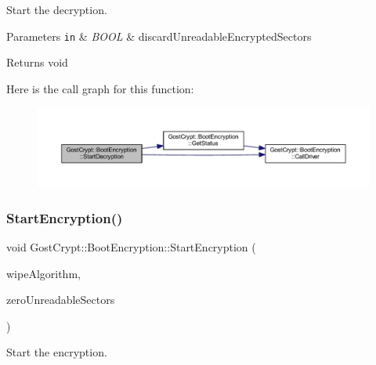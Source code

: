 Start the decryption. 


\begin{DoxyParams}[1]{Parameters}
\mbox{\tt in}  & {\em B\+O\+OL} & discard\+Unreadable\+Encrypted\+Sectors \\
\hline
\end{DoxyParams}
\begin{DoxyReturn}{Returns}
void 
\end{DoxyReturn}
Here is the call graph for this function\+:
\nopagebreak
\begin{figure}[H]
\begin{center}
\leavevmode
\includegraphics[width=350pt]{class_gost_crypt_1_1_boot_encryption_a1397fa6ebb63da2ca0a636cfa8262858_cgraph}
\end{center}
\end{figure}
\mbox{\label{class_gost_crypt_1_1_boot_encryption_a4dd591bdb27968b702694bcd7664e010}} 
\subsubsection{\texorpdfstring{Start\+Encryption()}{StartEncryption()}}
{\footnotesize\ttfamily void Gost\+Crypt\+::\+Boot\+Encryption\+::\+Start\+Encryption (\begin{DoxyParamCaption}\item[{Wipe\+Algorithm\+Id}]{wipe\+Algorithm,  }\item[{bool}]{zero\+Unreadable\+Sectors }\end{DoxyParamCaption})}



Start the encryption. 


